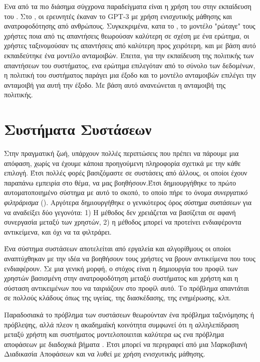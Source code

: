 Ενα από τα πιο διάσημα σύγχρονα παραδείγματα είναι η χρήση του στην εκπαίδευση του . Στο \cite{chatgpt_2022}, οι ερευνητές έκαναν  το {GPT-3} με χρήση ενισχυτικής μάθησης και ανατροφοδότησης από ανθρώπους. Συγκεκριμένα, κατα το , το μοντέλο "ρώταγε" τους χρήστες ποια από τις απαντήσεις θεωρούσαν καλύτερη σε σχέση με ένα ερώτημα, οι χρήστες ταξινομούσαν τις απαντήσεις από καλύτερη προς χειρότερη, και με βάση αυτό εκπαιδεύτηκε ένα μοντέλο ανταμοιβών. Έπειτα, για την εκπαίδευση της πολιτικής των απαντήσεων του συστήματος, ενα ερώτημα επιλεγόταν από το σύνολο των δεδομένων, η πολιτική του συστήματος παράγει μια έξοδο και το μοντέλο ανταμοιβών επιλέγει την ανταμοιβή για αυτή την έξοδο. Με βάση αυτό ανανεώνεται η ανταμοιβή της πολιτικής.

\section{Συστήματα Συστάσεων}

Στην πραγματική ζωή, υπάρχουν πολλές περιπτώσεις που πρέπει να πάρουμε μια απόφαση, χωρίς να έχουμε κάποια προηγούμενη πληροφορία σχετικά με την κάθε επιλογή. Έτσι πολλές φορές βασιζόμαστε σε συστάσεις από άλλους, οι οποίοι έχουν παραπάνω εμπειρία στο θέμα, να μας βοηθήσουν.Έτσι δημιουργήθηκε το πρώτο αυτοματοποιημένο σύστημα με αυτό το σκοπό, το οποίο πήρε το όνομα \textit{συνεργατικό φιλτράρισμα} (). Αργότερα δημιουργήθηκε ο γενικότερος όρος \textit{σύστημα συστάσεων} για να αναδείξει δύο γεγονότα: 1) Η μέθοδος δεν χρειάζεται να βασίζεται σε αφανή συνεργασία μεταξύ των χρηστών, 2) η μέθοδος μπορεί να προτείνει ενδιαφέροντα αντικείμενα, και όχι να τα φιλτράρει.

Ένα σύστημα συστάσεων αποτελείται από εργαλεία και αλγορίθμους οι οποίοι αναπτύχθηκαν με την ιδέα να βοηθήσουν τους χρήστες να βρουν αντικείμενα που τους ενδιαφέρουν. Σε μια γενική μορφή, ο στόχος είναι η δημιουργία του προφίλ των χρηστών βασισμένη στην ανατροφοδότηση μεταξύ συστήματος και χρήστη και η σύσταση αντικειμένων που να ταιριάζουν στο προφίλ αυτό. Το πρόβλημα απαντάται σε πολλούς κλάδους όπως της υγείας, της διασκέδασης, της ενημέρωσης, κλπ.

Παραδοσιακά το πρόβλημα των συστάσεων θεωρούνταν ένα πρόβλημα ταξινόμησης ή πρόβλεψης, αλλά πλεον η ακαδημαϊκή κοινότητα συμφωνεί ότι η αλληλεπίδραση μεταξύ χρήστη και συστήματος μοντελοποιειται καλύτερα ως ενα πρόβλημα αποφάσεων με διαδοχικά βήματα \cite{rl_recommenders_2021}. Έτσι μπορεί να περιγραφεί από μια Μαρκοβιανή Διαδικασία Αποφάσεων και να λυθεί με χρήση ενισχυτικής μάθησης.

